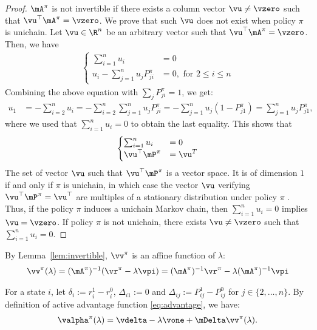 \begin{proof}
    $\mA^\pi$ is not invertible if there exists a column vector $\vu\neq\vzero$ such that $\vu^\top \mA^\pi=\vzero$.
    We prove that such $\vu$ does not exist when policy $\pi$ is unichain.
    Let $\vu\in\R^n$ be an arbitrary vector such that $\vu^\top \mA^\pi=\vzero$.
    Then, we have
    \begin{align*}
        \begin{cases}
            \sum_{i=1}^{n}u_i &= 0 \\
            u_i-\sum_{j=1}^{n}u_jP_{ji}^\pi &= 0, \text{ for } 2\le i\le n
        \end{cases}
    \end{align*}
    Combining the above equation with $\sum_j P^\pi_{ji}=1$, we get:
    \begin{align*}
        u_1 &= -\sum_{i=2}^n u_i
        =-\sum_{i=2}^n\sum_{j=1}^n u_j P^\pi_{ji}
        =-\sum_{j=1}^n u_j (1-P^\pi_{j1})
        = \sum_{j=1}^n u_j P^\pi_{j1},
    \end{align*}
    where we used that $\sum_{i=1}^{n}u_i=0$ to obtain the last equality.  
    This shows that 
    \begin{align*}
        \begin{cases}
            \sum_{i=1}^{n}u_i &= 0 \\
            \vu^\top\mP^\pi &=\vu^T
        \end{cases}
    \end{align*}
    The set of vector $\vu$ such that $\vu^\top\mP^\pi$ is a vector space. It is of dimension $1$ if and only if $\pi$ is unichain, in which case the vector $\vu$ verifying $\vu^\top\mP^\pi=\vu^\top$ are multiples of a stationary distribution under policy $\pi$ \cite{puterman2014markov}. Thus, if the policy $\pi$ induces a unichain Markov chain, then $\sum_{i=1}^{n}u_i = 0$ implies $\vu = \vzero$. If policy $\pi$ is not unichain, there exists $\vu\ne\vzero$ such that $\sum_{i=1}^{n}u_i = 0$.
\end{proof}

By Lemma~\ref{lem:invertible}, $\vv^{\pi}$ is an affine function of $\lambda$:
\begin{align}
    \label{eq:h is linear}
    \vv^{\pi}(\lambda) = (\mA^{\pi})^{-1}(\vr^{\pi} - \lambda \vpi) =(\mA^{\pi})^{-1}\vr^\pi - \lambda (\mA^{\pi})^{-1}\vpi
\end{align}

For a state $i$, let $\delta_i:=r^1_i - r^0_i$, $\Delta_{i1}:=0$ and $\Delta_{ij}:=P^1_{ij}-P^0_{ij}$ for $j\in\{2,\dots, n\}$. By definition of active advantage function \eqref{eq:advantage}, we have: 
\begin{align*}
    \valpha^\pi(\lambda)=\vdelta -\lambda\vone +\mDelta\vv^\pi(\lambda).
\end{align*}

